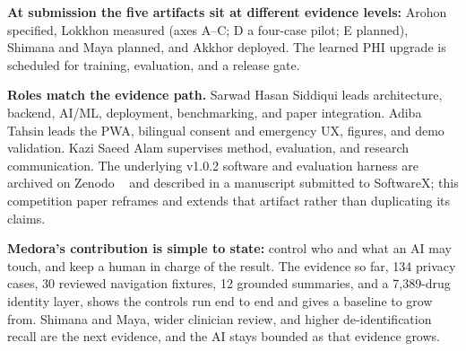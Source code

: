 \documentclass[12pt,twocolumn,a4paper]{article}
\begin{document}
\textbf{At submission the five artifacts sit at different evidence levels:} Arohon specified,
Lokkhon measured (axes A--C; D a four-case pilot; E planned), Shimana and Maya planned, and
Akkhor deployed. The learned PHI upgrade is scheduled for training, evaluation, and a release gate.

\textbf{Roles match the evidence path.} Sarwad Hasan Siddiqui leads architecture,
backend, AI/ML, deployment, benchmarking, and paper integration. Adiba Tahsin leads the
PWA, bilingual consent and emergency UX, figures, and demo validation. Kazi Saeed Alam
supervises method, evaluation, and research communication.
The underlying v1.0.2 software and evaluation harness are archived on Zenodo
~\cite{medoraarchive} and described in a manuscript submitted to SoftwareX; this competition
paper reframes and extends that artifact rather than duplicating its claims.

\textbf{Medora's contribution is simple to state:} control who and what an AI may touch, and
keep a human in charge of the result. The evidence so far, 134 privacy cases, 30 reviewed
navigation fixtures, 12 grounded summaries, and a 7,389-drug identity layer, shows the controls
run end to end and gives a baseline to grow from. Shimana and Maya, wider clinician review, and
higher de-identification recall are the next evidence, and the AI stays bounded as that evidence
grows.
\end{document}
